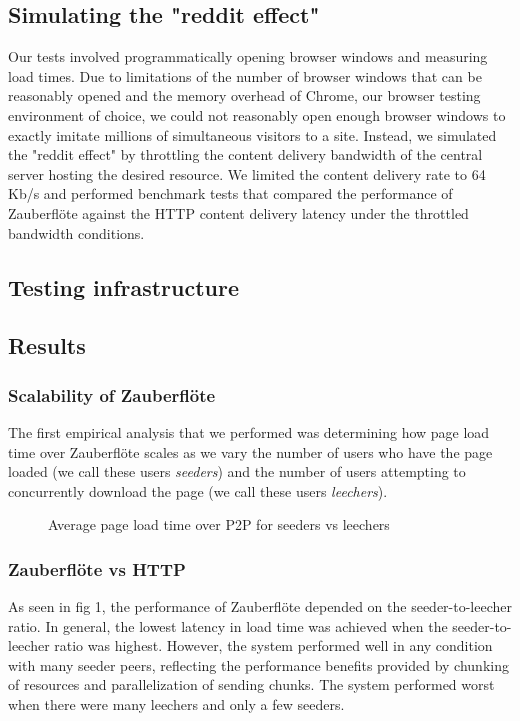 \documentclass[letterpaper,twocolumn,10pt]{article}
\newcommand{\zbf}{Zauberfl\"{o}te\xspace}
\begin{document}
\subsection{Simulating the "reddit effect"}
Our tests involved programmatically opening browser windows and measuring load times.
Due to limitations of the number of browser windows that can be reasonably opened
and the memory overhead of Chrome, our browser testing environment of choice, we could
not reasonably open enough browser windows to exactly imitate millions of simultaneous
visitors to a site. Instead, we simulated the "reddit effect" by throttling the content delivery
bandwidth of the central server hosting the desired resource. We limited the content delivery
rate to 64 Kb/s and performed benchmark tests that compared the performance of \zbf
against the HTTP content delivery latency under the throttled bandwidth conditions.


\subsection{Testing infrastructure}


\subsection{Results}


\subsubsection{Scalability of \zbf}
The first empirical analysis that we performed was determining how page load time
over \zbf scales as we vary the number of users who have the page loaded (we call
these users \textit{seeders}) and the number of users attempting to concurrently
download the page (we call these users \textit{leechers}).

\begin{figure}[h]
\caption{Average page load time over P2P for seeders vs leechers}
\end{figure}



\subsubsection{\zbf vs HTTP}
As seen in fig 1, the performance of \zbf depended on the seeder-to-leecher ratio.
In general, the lowest latency in load time was achieved when the seeder-to-leecher
ratio was highest. However, the system performed well in any condition with many
seeder peers, reflecting the performance benefits provided by chunking of resources
and parallelization of sending chunks. The system performed worst when there were many
leechers and only a few seeders.
\end{document}
